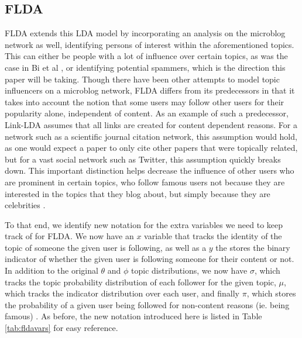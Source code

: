 \documentclass[a4paper]{article}
\begin{document}
\subsection{FLDA}
FLDA extends this LDA model by incorporating an analysis on the microblog network as well, identifying persons of interest within the aforementioned topics. This can either be people with a lot of influence over certain topics, as was the case in Bi et al \cite{flda}, or identifying potential spammers, which is the direction this paper will be taking. Though there have been other attempts to model topic influencers on a microblog network, FLDA differs from its predecessors in that it takes into account the notion that some users may follow other users for their popularity alone, independent of content. As an example of such a predecessor, Link-LDA assumes that all links are created for content dependent reasons. For a network such as a scientific journal citation network, this assumption would hold, as one would expect a paper to only cite other papers that were topically related, but for a vast social network such as Twitter, this assumption quickly breaks down. This important distinction helps decrease the influence of other users who are prominent in certain topics, who follow famous users not because they are interested in the topics that they blog about, but simply because they are celebrities \cite{flda}. 

To that end, we identify new notation for the extra variables we need to keep track of for FLDA. We now have an $x$ variable that tracks the identity of the topic of someone the given user is following, as well as a $y$ the stores the binary indicator of whether the given user is following someone for their content or not. In addition to the original $\theta$ and $\phi$ topic distributions, we now have $\sigma$, which tracks the topic probability distribution of each follower for the given topic, $\mu$, which tracks the indicator distribution over each user, and finally $\pi$, which stores the probability of a given user being followed for non-content reasons (ie. being famous) \cite{flda}. As before, the new notation introduced here is listed in Table \ref{tab:fldavars} for easy reference.
\end{document}
